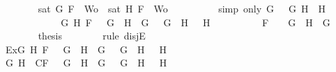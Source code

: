 \begin{isabellebody}
\ \ \ \ \ \ \isamarkupfalse%
\ {\isachardoublequoteopen}sat\ {\isacharparenleft}{\isacharbraceleft}G{\isacharcomma}\ F{\isacharbraceright}\ {\isasymunion}\ Wo{\isacharparenright}\ {\isasymor}\ sat\ {\isacharparenleft}{\isacharbraceleft}H{\isacharcomma}\ F{\isacharbraceright}\ {\isasymunion}\ Wo{\isacharparenright}{\isachardoublequoteclose}\isanewline
\ \ \ \ \ \ \ \ \isamarkupfalse%
\ {\isacharparenleft}simp\ only{\isacharcolon}\ {\isacartoucheopen}G\ {\isacharequal}\ \isactrlbold {\isasymnot}\ G{}{\isacartoucheclose}\ {\isacartoucheopen}H\ {\isacharequal}\ H{}{\isacartoucheclose}{\isacharparenright}\ \isanewline
\ \ \ \ \isamarkupfalse%
\isanewline
\ \ \ \ \ \ \isamarkupfalse%
\ {\isachardoublequoteopen}{\isacharparenleft}{\isasymexists}G{}\ H{}{\isachardot}\ F\ {\isacharequal}\ \isactrlbold {\isasymnot}\ {\isacharparenleft}G{}\ \isactrlbold {\isasymand}\ H{}{\isacharparenright}\ {\isasymand}\ G\ {\isacharequal}\ \isactrlbold {\isasymnot}\ G{}\ {\isasymand}\ H\ {\isacharequal}\ \isactrlbold {\isasymnot}\ H{}{\isacharparenright}\ {\isasymor}\ \isanewline
\ \ \ \ \ \ \ \ F\ {\isacharequal}\ \isactrlbold {\isasymnot}\ {\isacharparenleft}\isactrlbold {\isasymnot}\ G{\isacharparenright}\ {\isasymand}\ H\ {\isacharequal}\ G{\isachardoublequoteclose}\isanewline
\ \ \ \ \ \ \isamarkupfalse%
\ {\isacharquery}thesis\isanewline
\ \ \ \ \ \ \isamarkupfalse%
\ {\isacharparenleft}rule\ disjE{\isacharparenright}\isanewline
\ \ \ \ \ \ \ \ \isamarkupfalse%
\ Ex{}{\isacharcolon}{\isachardoublequoteopen}{\isasymexists}G{}\ H{}{\isachardot}\ F\ {\isacharequal}\ \isactrlbold {\isasymnot}\ {\isacharparenleft}G{}\ \isactrlbold {\isasymand}\ H{}{\isacharparenright}\ {\isasymand}\ G\ {\isacharequal}\ \isactrlbold {\isasymnot}\ G{}\ {\isasymand}\ H\ {\isacharequal}\ \isactrlbold {\isasymnot}\ H{}{\isachardoublequoteclose}\isanewline
\ \ \ \ \ \ \ \ \isamarkupfalse%
\ G{}\ H{}\ \ C{}{\isacharcolon}{\isachardoublequoteopen}F\ {\isacharequal}\ \isactrlbold {\isasymnot}\ {\isacharparenleft}G{}\ \isactrlbold {\isasymand}\ H{}{\isacharparenright}\ {\isasymand}\ G\ {\isacharequal}\ \isactrlbold {\isasymnot}\ G{}\ {\isasymand}\ H\ {\isacharequal}\ \isactrlbold {\isasymnot}\ H{}{\isachardoublequoteclose}\isanewline

\end{isabellebody}

